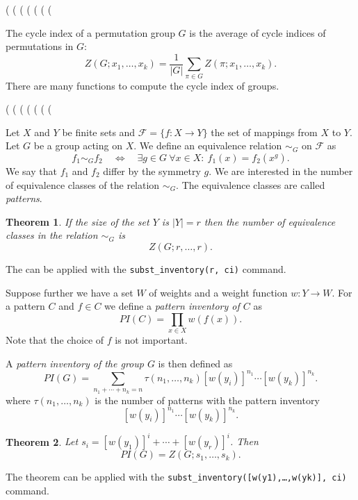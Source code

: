 \documentclass[11pt]{article}
\newcommand{\command}[1]{\texttt{#1}}
\newcommand{\DEF}[1]{{\em #1}}
\newtheorem{theorem}{Theorem}
\begin{document}
\begin{example}
(%
(%
(%
(%
(%
(%
(%
\end{example} 
%
The cycle index of a permutation group $G$ is the average of cycle
indices of permutations in $G$:
$$
Z(G;x_1,\ldots,x_k) = \frac{1}{|G|}\sum_{\pi\in G}Z(\pi; x_1,\ldots,x_k).
$$
There are many functions to compute the cycle index of groups.
\begin{example}
(%
(%
(%
(%
(%
(%
(%
\end{example}
%
Let $X$ and $Y$ be finite sets and $\mathcal{F}=\{f:X\to Y\}$ the set
of mappings from $X$ to $Y$. Let $G$ be a group acting on $X$. We
define an equivalence relation $\sim_G$ on $\mathcal{F}$ as
$$
f_1 \sim_G f_2 \quad \Longleftrightarrow \quad
\mbox{$\exists g\in G\ \forall x\in X: \ f_1(x)=f_2(x^g)$.}
$$
We say that $f_1$ and $f_2$ differ by the symmetry $g$. We are
interested in the number of equivalence classes of the relation
$\sim_G$. The equivalence classes are called \DEF{patterns}.

\begin{theorem}
\label{thm:polya1}
If the size of the set $Y$ is $|Y|=r$ then the number of equivalence
classes in the relation $\sim_G$ is
$$
Z(G; r,\ldots, r).
$$
\end{theorem}
The can be applied with the \command{subst\_inventory(r, ci)} command.

Suppose further we have a set $W$ of weights and a weight function
$w:Y\to W$. For a pattern $C$ and $f\in C$ we define a \DEF{pattern
  inventory of $C$} as
$$
PI(C) = \prod_{x\in X} w(f(x)).
$$
Note that the choice of $f$ is not important.

A \DEF{pattern inventory of the group $G$} is then defined as
$$
PI(G) = \sum_{n_1+\cdots+n_k=n}\tau(n_1,\ldots, n_k)[w(y_i)]^{n_1}\cdots [w(y_k)]^{n_k}.
$$
where $\tau(n_1,\ldots,n_k)$ is the number of patterns with the
pattern inventory
$$
[w(y_i)]^{n_1}\cdots [w(y_k)]^{n_k}.
$$

\begin{theorem}
\label{thm:polya2}
Let $s_i=[w(y_1)]^i+\cdots+[w(y_r)]^i$. Then
$$
PI(G) = Z(G; s_1,\ldots, s_k).
$$
\end{theorem}
The theorem can be applied with the
\command{subst\_inventory([w(y1),\ldots,w(yk)], ci)} command.
\end{document}
